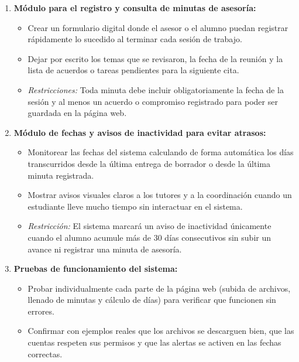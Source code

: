 \begin{enumerate}
    \item \textbf{Módulo para el registro y consulta de minutas de asesoría:}
    \begin{itemize}
        \item Crear un formulario digital donde el asesor o el alumno puedan registrar rápidamente lo sucedido al terminar cada sesión de trabajo.
        \item Dejar por escrito los temas que se revisaron, la fecha de la reunión y la lista de acuerdos o tareas pendientes para la siguiente cita.
        \item \textit{Restricciones:} Toda minuta debe incluir obligatoriamente la fecha de la sesión y al menos un acuerdo o compromiso registrado para poder ser guardada en la página web.
    \end{itemize}

    \item \textbf{Módulo de fechas y avisos de inactividad para evitar atrasos:}
    \begin{itemize}
        \item Monitorear las fechas del sistema calculando de forma automática los días transcurridos desde la última entrega de borrador o desde la última minuta registrada.
        \item Mostrar avisos visuales claros a los tutores y a la coordinación cuando un estudiante lleve mucho tiempo sin interactuar en el sistema.
        \item \textit{Restricción:} El sistema marcará un aviso de inactividad únicamente cuando el alumno acumule más de 30 días consecutivos sin subir un avance ni registrar una minuta de asesoría.
    \end{itemize}

    \item \textbf{Pruebas de funcionamiento del sistema:}
    \begin{itemize}
        \item Probar individualmente cada parte de la página web (subida de archivos, llenado de minutas y cálculo de días) para verificar que funcionen sin errores.
        \item Confirmar con ejemplos reales que los archivos se descarguen bien, que las cuentas respeten sus permisos y que las alertas se activen en las fechas correctas.
    \end{itemize}
\end{enumerate}